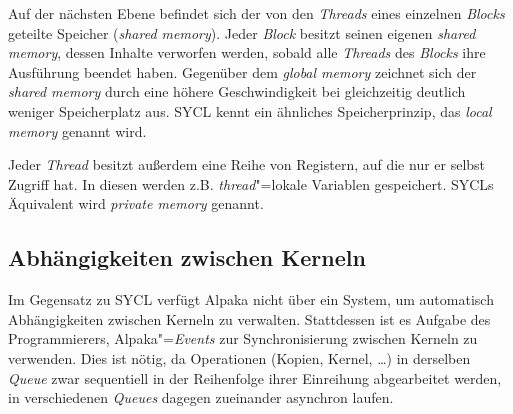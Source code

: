 Auf der nächsten Ebene befindet sich der von den \textit{Threads} eines
einzelnen \textit{Blocks} geteilte Speicher (\textit{shared memory}). Jeder
\textit{Block} besitzt seinen eigenen \textit{shared memory}, dessen Inhalte
verworfen werden, sobald alle \textit{Threads} des \textit{Blocks} ihre
Ausführung beendet haben. Gegenüber dem \textit{global memory} zeichnet sich der
\textit{shared memory} durch eine höhere Geschwindigkeit bei gleichzeitig
deutlich weniger Speicherplatz aus. SYCL kennt ein ähnliches Speicherprinzip,
das \textit{local memory} genannt wird.

Jeder \textit{Thread} besitzt außerdem eine Reihe von Registern, auf die nur er
selbst Zugriff hat. In diesen werden z.B. \textit{thread}"=lokale Variablen
gespeichert. SYCLs Äquivalent wird \textit{private memory} genannt.

\subsection{Abhängigkeiten zwischen Kerneln}
\label{alpaka:konzepte:abhaengigkeiten}

Im Gegensatz zu SYCL verfügt Alpaka nicht über ein System, um automatisch
Abhängigkeiten zwischen Kerneln zu verwalten. Stattdessen ist es Aufgabe des
Programmierers, Alpaka"=\textit{Events} zur Synchronisierung zwischen Kerneln zu
verwenden. Dies ist nötig, da Operationen (Kopien, Kernel, \ldots) in derselben
\textit{Queue} zwar sequentiell in der Reihenfolge ihrer Einreihung
abgearbeitet werden, in verschiedenen \textit{Queues} dagegen zueinander
asynchron laufen.

